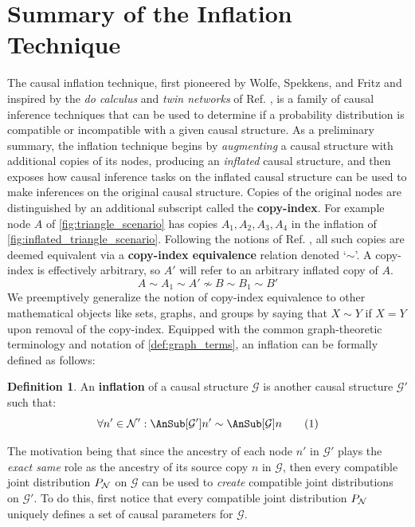 \documentclass[aps, 10pt, english, twoside, pra, nofootinbib, longbibliography]{revtex4-1}
\theoremstyle{plain}
\theoremstyle{definition}
\newtheorem{definition}[theorem]{Definition}
\theoremstyle{remark}
\newcommand{\graph}{\mathcal{G}}
\newcommand{\nodes}{\mathcal{N}}
\newcommand{\term}[1]{\textcolor{Mahogany}{\textbf{#1}}}
\begin{document}

    \section{Summary of the Inflation Technique}
    \label{sec:summary_inflation}
    The causal inflation technique, first pioneered by Wolfe, Spekkens, and Fritz \cite{Inflation} and inspired by the \textit{do calculus} and \textit{twin networks} of Ref. \cite{Pearl_2009}, is a family of causal inference techniques that can be used to determine if a probability distribution is compatible or incompatible with a given causal structure. As a preliminary summary, the inflation technique begins by \textit{augmenting} a causal structure with additional copies of its nodes, producing an \textit{inflated} causal structure, and then exposes how causal inference tasks on the inflated causal structure can be used to make inferences on the original causal structure. Copies of the original nodes are distinguished by an additional subscript called the \term{copy-index}. For example node $A$ of \cref{fig:triangle_scenario} has copies $A_1, A_2, A_3, A_4$ in the inflation of \cref{fig:inflated_triangle_scenario}. Following the notions of Ref. \cite{Inflation}, all such copies are deemed equivalent via a \term{copy-index equivalence} relation denoted `$\sim$'. A copy-index is effectively arbitrary, so $A'$ will refer to an arbitrary inflated copy of $A$.
    \[ A \sim A_1 \sim A' \not\sim B \sim B_1 \sim B' \]
    We preemptively generalize the notion of copy-index equivalence to other mathematical objects like sets, graphs, and groups by saying that $X \sim Y$ if $X = Y$ upon removal of the copy-index. Equipped with the common graph-theoretic terminology and notation of \cref{def:graph_terms}, an inflation can be formally defined as follows:
    \begin{definition}
        An \term{inflation} of a causal structure $\graph$ is another causal structure $\graph'$ such that:
        \[ \forall n' \in \nodes': \AnSub[\graph']{n'} \sim \AnSub[\graph]{n} \eq \label{eq:inflation_defn}\]
    \end{definition}
    The motivation being that since the ancestry of each node $n'$ in $\graph'$ plays the \textit{exact same} role as the ancestry of its source copy $n$ in $\graph$, then every compatible joint distribution $\prob[\nodes]$ on $\graph$ can be used to \textit{create} compatible joint distributions on $\graph'$. To do this, first notice that every compatible joint distribution $\prob[\nodes]$ uniquely defines a set of causal parameters for $\graph$.
\end{document}
